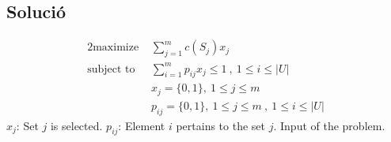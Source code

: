 \documentclass{article}
\begin{document}
\subsection{Solució}
\begin{alignat*}{2}
    \text{maximize }   & \sum_{j=1}^m c(S_j)x_j  \\
    \text{subject to } & \sum_{i=1}^{m} p_{ij}x_j \leq 1 \ , \  1\leq i\leq |U|\\
                       & x_j = \{0,1\},\  1\leq j\leq m\\
                       & p_{ij} = \{0,1\},\  1\leq j\leq m\ ,\  1\leq i\leq |U|
\end{alignat*}
$x_j$: Set $j$ is selected.
\newline
$p_{ij}$: Element $i$ pertains to the set $j$. Input of the problem. 
\end{document}
